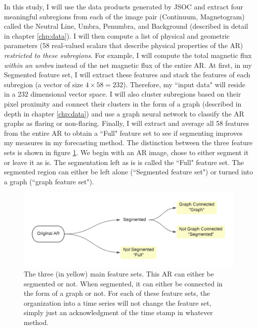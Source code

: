In this study, I will use the data products generated by JSOC and extract four meaningful subregions from each of the image pair (Continuum, Magnetogram) called the Neutral Line, Umbra, Penumbra, and Background (described in detail in chapter \ref{chp:data}). I will then compute a list of physical and geometric parameters (58 real-valued scalars that describe physical properties of the AR) \textit{restricted to these subregions}. For example, I will compute the total magnetic flux \textit{within an umbra} instead of the net magnetic flux of the entire AR. At first, in my Segmented feature set, I will extract these features and stack the features of each subregion (a vector of size $4 \times 58 = 232$). Therefore, my ``input data" will reside in a $232$ dimensional vector space. I will also cluster subregions based on their pixel proximity and connect their clusters in the form of a graph (described in depth in chapter \ref{chp:data}) and use a graph neural network to classify the AR graphs as flaring or non-flaring. Finally, I will extract and average all 58 features from the entire AR to obtain a ``Full" feature set to see if segmenting improves my measures in my forecasting method. The distinction between the three feature sets is shown in figure \ref{fig:pipeline}. We begin with an AR image, chose to either segment it or leave it as is. The segmentation left as is is called the ``Full" feature set. The segmented region can either be left alone (``Segmented feature set") or turned into a graph (``graph feature set").
\begin{figure}[h]
    \centering
    \includegraphics[width=0.8\linewidth]{ThesisFilePkg/figures/data/pipeline.png}
    \caption{The three (in yellow) main feature sets. This AR can either be segmented or not. When segmented, it can either be connected in the form of a graph or not. For each of these feature sets, the organization into a time series will not change the feature set, simply just an acknowledgment of the time stamp in whatever method.}
    \label{fig:pipeline}
\end{figure}

